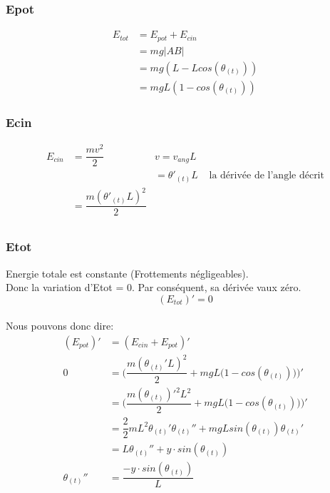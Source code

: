 \documentclass[11pt]{article}
\begin{document}
\subsubsection{Epot}
\begin{equation}
\begin{split}
    E_{tot} & = E_{pot} + E_{cin} \\
    & = mg|AB| \\
    & = mg(L-Lcos(\theta_{(t)})) \\
    & = mgL(1-cos(\theta_{(t)}))
\end{split}
\end{equation}

\subsubsection{Ecin}
\begin{align*}
E_{cin} & = \dfrac{mv^2}{2}  & v = v_{ang}L \\
&     & = \theta ' _{(t)}L & \text{ la dérivée de l'angle décrit} \\
& = \dfrac{m(\theta ' _{(t)} L)^2}{2}\\
\end{align*}

\subsubsection{Etot}
Energie totale est constante (Frottements négligeables). \\
Donc la variation d'Etot = 0. Par conséquent, sa dérivée vaux zéro.\\
$$(E_{tot})'=0$$ \\
Nous pouvons donc dire:
\begin{equation}
\begin{split}
    (E_{pot})'  & = (E_{cin} + E_{pot})' \\
    0 & = \Bigg( \dfrac{m(\theta_{(t)}' L)^2}{2} + mgL\Big(1-cos(\theta_{(t)})\Big)\Bigg)' \\
    & = \Bigg( \dfrac{m(\theta_{(t)})'^2 L^2}{2} + mgL\Big(1-cos(\theta_{(t)})\Big)\Bigg)' \\
    & = \dfrac{2}{2}mL^2 \theta_{(t)} ' \theta_{(t)}'' + mgLsin(\theta_{(t)})\theta_{(t)}' \\
    & = L \theta_{(t)}'' + y\cdot sin(\theta_{(t)}) \\
    \theta_{(t)}'' & =\dfrac{ -y\cdot sin(\theta_{(t)})}{L}
\end{split}
\end{equation}
\end{document}
